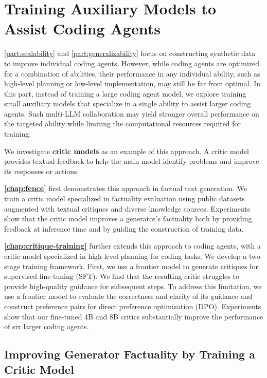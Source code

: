 

\part{Training Auxiliary Models to Assist Coding Agents}
\label{part:usage}


\autoref{part:scalability} and \autoref{part:generalizability} focus on constructing synthetic data to improve individual coding agents. However, while coding agents are optimized for a combination of abilities, their performance in any individual ability, such as high-level planning or low-level implementation, may still be far from optimal. In this part, instead of training a large coding agent model, we explore training small auxiliary models that specialize in a single ability to assist larger coding agents. Such multi-LLM collaboration may yield stronger overall performance on the targeted ability while limiting the computational resources required for training.

We investigate \textbf{critic models} as an example of this approach. A critic model provides textual feedback to help the main model identify problems and improve its responses or actions. 

\textbf{\autoref{chap:fence}} first demonstrates this approach in factual text generation. We train a critic model specialized in factuality evaluation using public datasets augmented with textual critiques and diverse knowledge sources. Experiments show that the critic model improves a generator’s factuality both by providing feedback at inference time and by guiding the construction of training data.

\textbf{\autoref{chap:critique-training}} further extends this approach to coding agents, with a critic model specialized in high-level planning for coding tasks. We develop a two-stage training framework. First, we use a frontier model to generate critiques for supervised fine-tuning (SFT). We find that the resulting critic struggles to provide high-quality guidance for subsequent steps. To address this limitation, we use a frontier model to evaluate the correctness and clarity of its guidance and construct preference pairs for direct preference optimization (DPO). Experiments show that our fine-tuned 4B and 8B critics substantially improve the performance of six larger coding agents.


\chapter{Improving Generator Factuality by Training a Critic Model}
\label{chap:fence}

